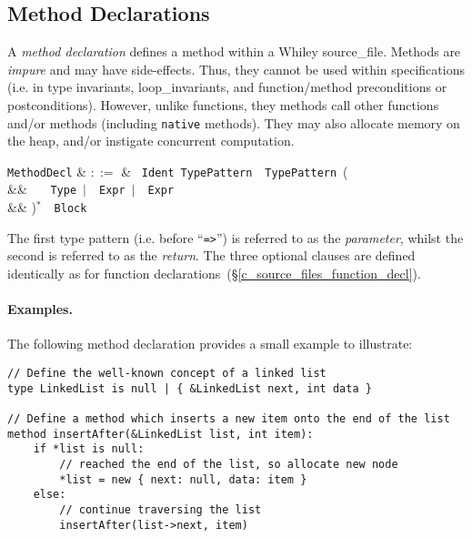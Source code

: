 
\subsection{Method Declarations}
\label{c_source_files_method_decl}

A {\em method declaration} defines a method within a Whiley
\gls{source_file}.  Methods are {\em impure} and may have
side-effects.  Thus, they cannot be used within specifications
(i.e. in type invariants, \gls{loop_invariant}s, and function/method
\gls{precondition}s or \gls{postcondition}s).  However, unlike
functions, they methods call other functions and/or methods (including
\lstinline{native} methods).  They may also allocate memory on the
heap, and/or instigate concurrent computation.

\begin{syntax}
  \verb+MethodDecl+ & $::=$ & \ \verb+Ident+\
  \verb+TypePattern+\ \token{=>}\ \verb+TypePattern+\ \big(\\
  && \ \ \ \verb+Type+\ $|$\ \
  \verb+Expr+\ $|$\ \ \verb+Expr+\\
  && \big)$^*$\ \token{:}\ \verb+Block+\\
\end{syntax}

The first type pattern (i.e. before ``\lstinline{=>}'') is referred to as the {\em parameter}, whilst the second is referred to as the {\em   return}.  The three optional clauses are defined identically as for function declarations~(\S\ref{c_source_files_function_decl}).

\paragraph{Examples.}  The following method declaration provides a
small example to illustrate:

\begin{lstlisting}
// Define the well-known concept of a linked list
type LinkedList is null | { &LinkedList next, int data }

// Define a method which inserts a new item onto the end of the list
method insertAfter(&LinkedList list, int item):
    if *list is null:
        // reached the end of the list, so allocate new node
        *list = new { next: null, data: item }
    else:
        // continue traversing the list
        insertAfter(list->next, item)
\end{lstlisting}




